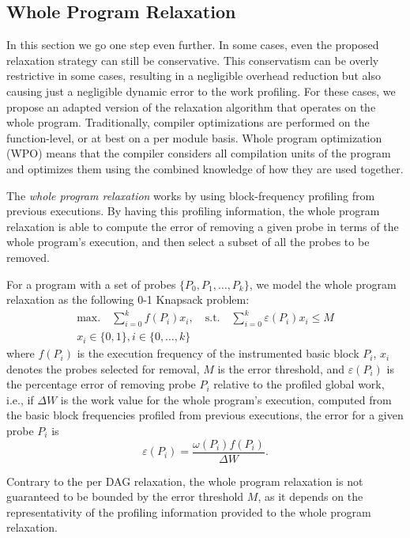 \subsection{Whole Program Relaxation}

In this section we go one step even further.
In some cases, even the proposed relaxation strategy can still be conservative.
This conservatism can be overly restrictive in some cases, resulting in a
negligible overhead reduction but also causing just a negligible dynamic error
to the work profiling.
For these cases, we propose an adapted version of the relaxation algorithm that
operates on the whole program.
Traditionally, compiler optimizations are performed on the function-level, or at
best on a per module basis.
Whole program optimization (WPO) means that the compiler considers all
compilation units of the program and optimizes them using the combined knowledge
of how they are used together.

The \textit{whole program relaxation} works by using block-frequency profiling
from previous executions.
By having this profiling information, the whole program relaxation is able to
compute the error of removing a given probe in terms of the whole program's execution,
and then select a subset of all the probes to be removed.

For a program with a set of probes $\{P_0, P_1, \ldots, P_k\}$, we model the
whole program relaxation as the following 0-1 Knapsack problem:
\begin{gather*}
\textrm{max.}\quad\sum_{i=0}^{k} f(P_i)x_i,\quad
\textrm{s.t.}\quad\sum_{i=0}^{k} \varepsilon(P_i)x_i \leq M \\
x_i\in\{0,1\}, i\in\{0,\ldots,k\}
\end{gather*}
where $f(P_i)$ is the execution frequency of the instrumented basic block $P_i$,
$x_i$ denotes the probes selected for removal, $M$ is the error threshold, and
$\varepsilon(P_i)$ is the percentage error of removing probe $P_i$ relative to
the profiled global work, i.e.,
if $\Delta W$ is the work value for the whole program's execution, computed from
the basic block frequencies profiled from previous executions, the error for a
given probe $P_i$ is
\[
\varepsilon(P_i) = \frac{\omega(P_i)f(P_i)}{\Delta W}.
\]

Contrary to the per DAG relaxation, the whole program relaxation is not
guaranteed to be bounded by the error threshold $M$,
as it depends on the representativity %
of the profiling information provided to the whole program relaxation.
